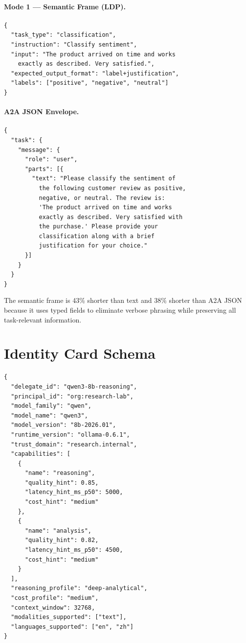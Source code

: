 \documentclass[11pt,a4paper]{article}
\newcommand{\ldp}{\textsc{LDP}}
\begin{document}
\paragraph{Mode 1 --- Semantic Frame (\ldp{}).}
\begin{lstlisting}[style=protocol]
{
  "task_type": "classification",
  "instruction": "Classify sentiment",
  "input": "The product arrived on time and works
    exactly as described. Very satisfied.",
  "expected_output_format": "label+justification",
  "labels": ["positive", "negative", "neutral"]
}
\end{lstlisting}

\paragraph{A2A JSON Envelope.}
\begin{lstlisting}[style=protocol]
{
  "task": {
    "message": {
      "role": "user",
      "parts": [{
        "text": "Please classify the sentiment of
          the following customer review as positive,
          negative, or neutral. The review is:
          'The product arrived on time and works
          exactly as described. Very satisfied with
          the purchase.' Please provide your
          classification along with a brief
          justification for your choice."
      }]
    }
  }
}
\end{lstlisting}

\noindent The semantic frame is 43\% shorter than text and 38\% shorter than A2A JSON because it uses typed fields to eliminate verbose phrasing while preserving all task-relevant information.

\section{Identity Card Schema}
\label{app:identity-card}

\begin{lstlisting}[style=protocol]
{
  "delegate_id": "qwen3-8b-reasoning",
  "principal_id": "org:research-lab",
  "model_family": "qwen",
  "model_name": "qwen3",
  "model_version": "8b-2026.01",
  "runtime_version": "ollama-0.6.1",
  "trust_domain": "research.internal",
  "capabilities": [
    {
      "name": "reasoning",
      "quality_hint": 0.85,
      "latency_hint_ms_p50": 5000,
      "cost_hint": "medium"
    },
    {
      "name": "analysis",
      "quality_hint": 0.82,
      "latency_hint_ms_p50": 4500,
      "cost_hint": "medium"
    }
  ],
  "reasoning_profile": "deep-analytical",
  "cost_profile": "medium",
  "context_window": 32768,
  "modalities_supported": ["text"],
  "languages_supported": ["en", "zh"]
}
\end{lstlisting}
\end{document}
